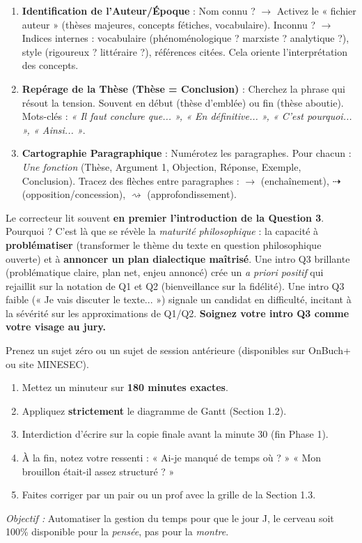 \documentclass[11pt]{article}
\begin{document}
\begin{enumerate}
    \item \textbf{Identification de l'Auteur/Époque} : Nom connu ? $\rightarrow$ Activez le « fichier auteur » (thèses majeures, concepts fétiches, vocabulaire). Inconnu ? $\rightarrow$ Indices internes : vocabulaire (phénoménologique ? marxiste ? analytique ?), style (rigoureux ? littéraire ?), références citées. Cela oriente l'interprétation des concepts.
    \item \textbf{Repérage de la Thèse (Thèse = Conclusion)} : Cherchez la phrase qui résout la tension. Souvent en début (thèse d'emblée) ou fin (thèse aboutie). Mots-clés : \emph{« Il faut conclure que... », « En définitive... », « C'est pourquoi... », « Ainsi... »}.
    \item \textbf{Cartographie Paragraphique} : Numérotez les paragraphes. Pour chacun : \emph{Une fonction} (Thèse, Argument 1, Objection, Réponse, Exemple, Conclusion). Tracez des flèches entre paragraphes : $\rightarrow$ (enchaînement), $\dashrightarrow$ (opposition/concession), $\rightsquigarrow$ (approfondissement).
\end{enumerate}

\begin{savaistu}
Le correcteur lit souvent \textbf{en premier l'introduction de la Question 3}. Pourquoi ? C'est là que se révèle la \emph{maturité philosophique} : la capacité à \textbf{problématiser} (transformer le thème du texte en question philosophique ouverte) et à \textbf{annoncer un plan dialectique maîtrisé}. Une intro Q3 brillante (problématique claire, plan net, enjeu annoncé) crée un \emph{a priori positif} qui rejaillit sur la notation de Q1 et Q2 (bienveillance sur la fidélité). Une intro Q3 faible (« Je vais discuter le texte... ») signale un candidat en difficulté, incitant à la sévérité sur les approximations de Q1/Q2. \textbf{Soignez votre intro Q3 comme votre visage au jury.}
\end{savaistu}

\begin{exercice}
Prenez un sujet zéro ou un sujet de session antérieure (disponibles sur OnBuch+ ou site MINESEC).
\begin{enumerate}
    \item Mettez un minuteur sur \textbf{180 minutes exactes}.
    \item Appliquez \textbf{strictement} le diagramme de Gantt (Section 1.2).
    \item Interdiction d'écrire sur la copie finale avant la minute 30 (fin Phase 1).
    \item À la fin, notez votre ressenti : « Ai-je manqué de temps où ? » « Mon brouillon était-il assez structuré ? »
    \item Faites corriger par un pair ou un prof avec la grille de la Section 1.3.
\end{enumerate}
\emph{Objectif :} Automatiser la gestion du temps pour que le jour J, le cerveau soit 100\% disponible pour la \emph{pensée}, pas pour la \emph{montre}.
\end{exercice}
\end{document}
